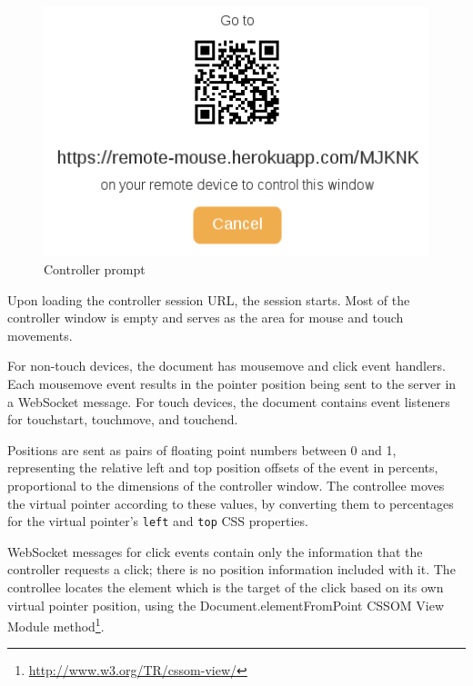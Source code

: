 \documentclass[a4paper,english,twocolumn]{article}
\begin{document}
\begin{figure}[htb]
  \begin{center}
    \includegraphics[scale=0.3]{prompt}
    \caption{Controller prompt}
  \end{center}
\end{figure}

Upon loading the controller session URL, the session starts. Most of
the controller window is empty and serves as the area for mouse and
touch movements.

For non-touch devices, the document has mousemove and click event
handlers. Each mousemove event results in the pointer position being
sent to the server in a WebSocket message. For touch devices, the
document contains event listeners for touchstart, touchmove, and
touchend.

Positions are sent as pairs of floating point numbers between 0 and 1,
representing the relative left and top position offsets of the event
in percents, proportional to the dimensions of the controller
window. The controllee moves the virtual pointer according to these
values, by converting them to percentages for the virtual pointer's
\verb!left! and \verb!top! CSS properties.

WebSocket messages for click events contain only the information that
the controller requests a click; there is no position information
included with it. The controllee locates the element which is the
target of the click based on its own virtual pointer position, using
the Document.elementFromPoint CSSOM View Module
method\footnote{\url{http://www.w3.org/TR/cssom-view/}}.
\end{document}
